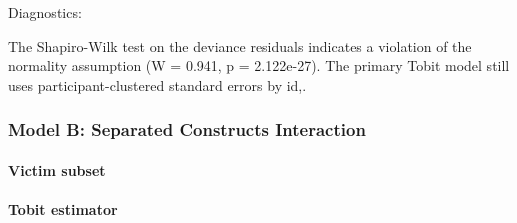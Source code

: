 \documentclass[11pt]{article}
\begin{document}
Diagnostics:

The Shapiro-Wilk test on the deviance residuals indicates a violation of the normality assumption (W = 0.941, p = 2.122e-27). The primary Tobit model still uses participant-clustered standard errors by id,.


\subsubsection{Model B: Separated Constructs Interaction}
\paragraph{Victim subset}

\paragraph{Tobit estimator}
\end{document}
